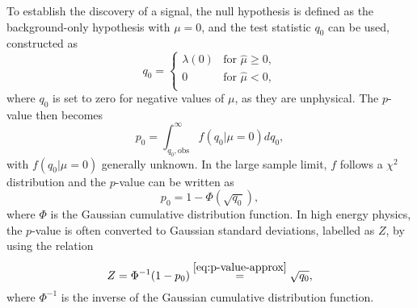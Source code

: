 To establish the discovery of a signal, the null hypothesis is defined as the background-only hypothesis with $\mu = 0$, and the test statistic $q_0$ can be used, constructed as
\begin{equation}
    q_0 =
     \begin{cases}
       \lambda(0) & \text{for } \hat{\mu} \ge 0, \\
       0 & \text{for } \hat{\mu} < 0,  \\
     \end{cases}
     \label{eq:q0}
  \end{equation}
where $q_0$ is set to zero for negative values of $\mu$, as they are unphysical.
The $p$-value then becomes
\begin{equation}
    \label{eq:p-value-discovery}
    p_0 = \int_{q_0, \text{obs}}^{\infty} f \left( q_0 | \mu = 0 \right) dq_0,
\end{equation}
with $f \left( q_0 | \mu = 0 \right)$ generally unknown. In the large sample limit, $f$ follows a $\chi^2$ distribution and the $p$-value can be written as
\begin{equation}
    \label{eq:p-value-approx}
    p_0 = 1 - \Phi( \sqrt{q_0}),
\end{equation}
where $\Phi$ is the Gaussian cumulative distribution function. 
In high energy physics, the $p$-value is often converted to Gaussian standard deviations, labelled as $Z$, by using the relation
\begin{equation}
    \label{eq:Z0}
    Z = \Phi^{-1} ( 1 - p_0) \overset{\ref{eq:p-value-approx}}{=} \sqrt{q_0},
\end{equation}
where $\Phi^{-1}$ is the inverse of the Gaussian cumulative distribution function. 

